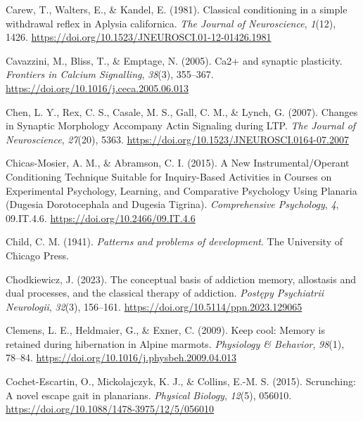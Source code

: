 \documentclass[
  jou,
  floatsintext,
  longtable,
  nolmodern,
  notxfonts,
  notimes,
  donotrepeattitle,
  colorlinks=true,linkcolor=blue,citecolor=blue,urlcolor=blue]{apa7}
\newlength{\cslhangindent}
\newenvironment{CSLReferences}[2] %
 {\begin{list}{}{%
  \setlength{\itemindent}{0pt}
  \setlength{\leftmargin}{0pt}
  \setlength{\parsep}{0pt}
  \ifodd #1
   \setlength{\leftmargin}{\cslhangindent}
   \setlength{\itemindent}{-1\cslhangindent}
  \fi
  \setlength{\itemsep}{#2\baselineskip}}}
 {\end{list}}
\begin{document}
\begin{CSLReferences}{1}{0}
Carew, T., Walters, E., \& Kandel, E. (1981). Classical conditioning in
a simple withdrawal reflex in {Aplysia} californica. \emph{The Journal
of Neuroscience}, \emph{1}(12), 1426.
\url{https://doi.org/10.1523/JNEUROSCI.01-12-01426.1981}

Cavazzini, M., Bliss, T., \& Emptage, N. (2005). Ca2+ and synaptic
plasticity. \emph{Frontiers in Calcium Signalling}, \emph{38}(3),
355--367. \url{https://doi.org/10.1016/j.ceca.2005.06.013}

Chen, L. Y., Rex, C. S., Casale, M. S., Gall, C. M., \& Lynch, G.
(2007). Changes in {Synaptic} {Morphology} {Accompany} {Actin}
{Signaling} during {LTP}. \emph{The Journal of Neuroscience},
\emph{27}(20), 5363.
\url{https://doi.org/10.1523/JNEUROSCI.0164-07.2007}

Chicas-Mosier, A. M., \& Abramson, C. I. (2015). A {New}
{Instrumental}/{Operant} {Conditioning} {Technique} {Suitable} for
{Inquiry}-{Based} {Activities} in {Courses} on {Experimental}
{Psychology}, {Learning}, and {Comparative} {Psychology} {Using}
{Planaria} ({Dugesia} {Dorotocephala} and {Dugesia} {Tigrina}).
\emph{Comprehensive Psychology}, \emph{4}, 09.IT.4.6.
\url{https://doi.org/10.2466/09.IT.4.6}

Child, C. M. (1941). \emph{Patterns and problems of development}. The
University of Chicago Press.

Chodkiewicz, J. (2023). The conceptual basis of addiction memory,
allostasis and dual processes, and the classical therapy of addiction.
\emph{Postępy Psychiatrii Neurologii}, \emph{32}(3), 156--161.
\url{https://doi.org/10.5114/ppn.2023.129065}

Clemens, L. E., Heldmaier, G., \& Exner, C. (2009). Keep cool: {Memory}
is retained during hibernation in {Alpine} marmots. \emph{Physiology \&
Behavior}, \emph{98}(1), 78--84.
\url{https://doi.org/10.1016/j.physbeh.2009.04.013}

Cochet-Escartin, O., Mickolajczyk, K. J., \& Collins, E.-M. S. (2015).
Scrunching: A novel escape gait in planarians. \emph{Physical Biology},
\emph{12}(5), 056010.
\url{https://doi.org/10.1088/1478-3975/12/5/056010}


\end{CSLReferences}
\end{document}
